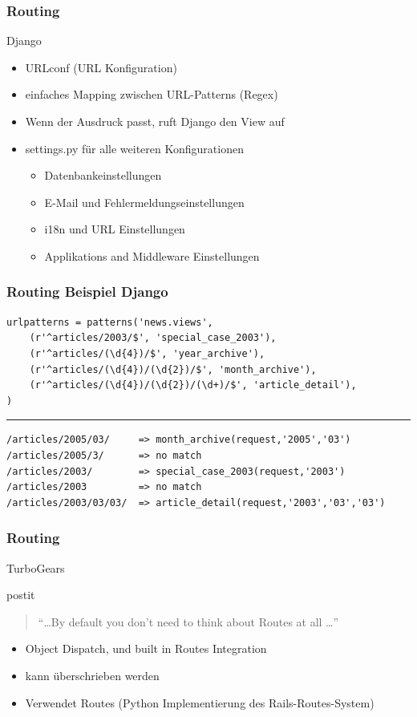 \documentclass[
    t,
    smaller,
    compress,
    xcolor=svgnames,            %
    table,
]{beamer}
\newenvironment{beamerpostit}[1]%
{\begin{beamercolorbox}[wd=\textwidth,sep=2pt,rounded=true,shadow=true]{postit} #1}%
{\end{beamercolorbox}}%
\begin{document}
\begin{frame}
  \frametitle{Routing}
    Django
    \begin{itemize}[<1->]
        \item URLconf (URL Konfiguration)
        \item einfaches Mapping zwischen URL-Patterns (Regex)
        \item Wenn der Ausdruck passt, ruft Django den View auf
        \item settings.py für alle weiteren Konfigurationen
        \begin{itemize}[<1->]
            \item Datenbankeinstellungen
            \item E-Mail und Fehlermeldungseinstellungen
            \item i18n und URL Einstellungen
            \item Applikations and Middleware Einstellungen
        \end{itemize}
     \end{itemize}

\end{frame}

\begin{frame}[fragile]
\frametitle{Routing Beispiel Django}
\begin{lstlisting}
urlpatterns = patterns('news.views',
    (r'^articles/2003/$', 'special_case_2003'),
    (r'^articles/(\d{4})/$', 'year_archive'),
    (r'^articles/(\d{4})/(\d{2})/$', 'month_archive'),
    (r'^articles/(\d{4})/(\d{2})/(\d+)/$', 'article_detail'),
)
\end{lstlisting}
\hrule
\begin{lstlisting}
/articles/2005/03/     => month_archive(request,'2005','03')
/articles/2005/3/      => no match
/articles/2003/        => special_case_2003(request,'2003')
/articles/2003         => no match
/articles/2003/03/03/  => article_detail(request,'2003','03','03')
    \end{lstlisting}
\end{frame}


\begin{frame}
  \frametitle{Routing}
TurboGears

\begin{beamerpostit}
    \begin{quote}
      “\dots By default you don’t need to think about Routes at all \dots”
    \end{quote} %
  \end{beamerpostit}

     \begin{itemize}[<1->]
        \item Object Dispatch, und built in Routes Integration
        \item kann überschrieben werden
        \item Verwendet Routes (Python Implementierung des Rails-Routes-System)
    \end{itemize}
\end{frame}
\end{document}
